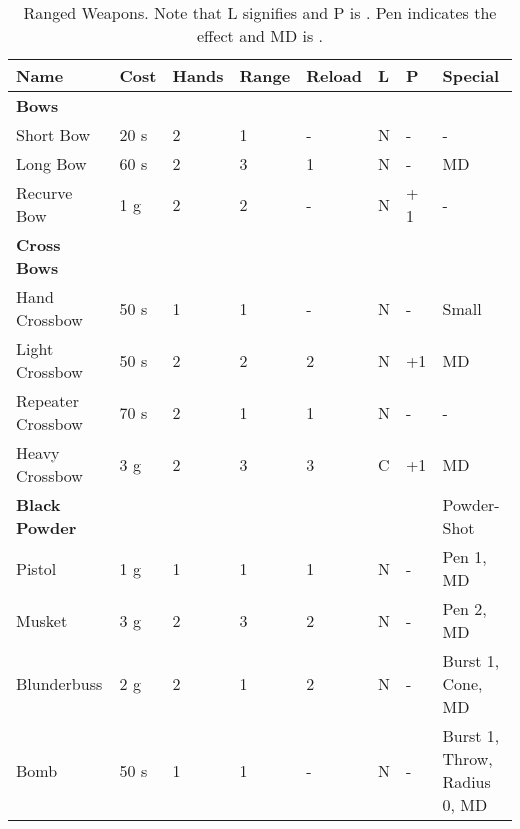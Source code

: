 \begin{table}[ht!]
	\centering
	\caption{Ranged Weapons. Note that L signifies  and P is . Pen indicates the  effect and MD is .}
	\begin{tabular}{|l|l|l|l|l|l|l|l|}
		\hline
		Name & Cost & Hands & Range & Reload & L & P & Special\\ [0.5ex]
		\hline
		\textbf{Bows} & & & & & & & \\
		\hline
		Short Bow & 20 s & 2 & 1 & - & N & - & -\\
		Long Bow & 60 s & 2 & 3 & 1 & N & - & MD \\
		Recurve Bow & 1 g & 2 & 2 & - & N & + 1 & -\\
		\hline
		\textbf{Cross Bows} & & & &  & &  & \\
		\hline
		Hand Crossbow & 50 s & 1 & 1 & - & N & - & Small \\ 
		Light Crossbow &  50 s & 2 & 2 & 2 & N & +1 & MD\\
		Repeater Crossbow & 70 s & 2 & 1 & 1 & N & - & - \\  
		Heavy Crossbow & 3 g & 2 & 3 & 3 & C & +1 & MD \\
		\hline
		\textbf{Black Powder} & & & & & & & Powder-Shot \\
		\hline
		Pistol & 1 g & 1 & 1 & 1 & N & - & Pen 1, MD \\
		Musket & 3 g & 2 & 3 & 2 & N & - & Pen 2, MD \\
		Blunderbuss & 2 g & 2 & 1 & 2 & N & - & Burst 1, Cone, MD\\
		Bomb & 50 s & 1 & 1 & - & N & - & Burst 1, Throw, Radius 0, MD \\
		\hline 
	\end{tabular}
	\label{tab:range-weps}    
\end{table}

